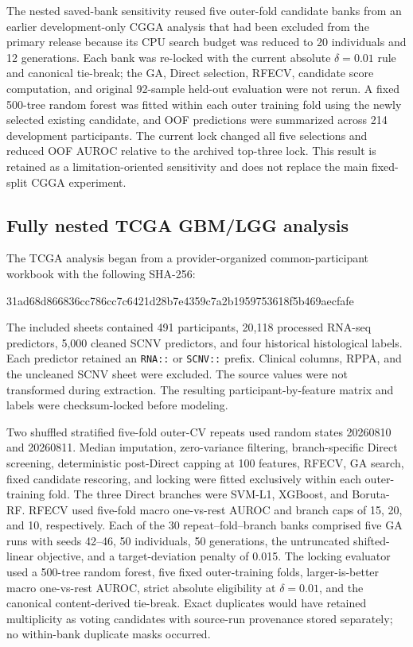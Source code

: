 The nested saved-bank sensitivity reused five outer-fold candidate banks from an earlier development-only CGGA analysis that had been excluded from the primary release because its CPU search budget was reduced to 20 individuals and 12 generations. Each bank was re-locked with the current absolute \(\delta=0.01\) rule and canonical tie-break; the GA, Direct selection, RFECV, candidate score computation, and original 92-sample held-out evaluation were not rerun. A fixed 500-tree random forest was fitted within each outer training fold using the newly selected existing candidate, and OOF predictions were summarized across 214 development participants. The current lock changed all five selections and reduced OOF AUROC relative to the archived top-three lock. This result is retained as a limitation-oriented sensitivity and does not replace the main fixed-split CGGA experiment.

\subsection{Fully nested TCGA GBM/LGG analysis}

The TCGA analysis began from a provider-organized common-participant workbook with the following SHA-256:
\begin{center}\scriptsize\ttfamily 31ad68d866836cc786cc7c6421d28b7e4359c7a2b1959753618f5b469aecfafe\end{center}
The included sheets contained 491 participants, 20,118 processed RNA-seq predictors, 5,000 cleaned SCNV predictors, and four historical histological labels. Each predictor retained an \texttt{RNA::} or \texttt{SCNV::} prefix. Clinical columns, RPPA, and the uncleaned SCNV sheet were excluded. The source values were not transformed during extraction. The resulting participant-by-feature matrix and labels were checksum-locked before modeling.

Two shuffled stratified five-fold outer-CV repeats used random states 20260810 and 20260811. Median imputation, zero-variance filtering, branch-specific Direct screening, deterministic post-Direct capping at 100 features, RFECV, GA search, fixed candidate rescoring, and locking were fitted exclusively within each outer-training fold. The three Direct branches were SVM-L1, XGBoost, and Boruta-RF. RFECV used five-fold macro one-vs-rest AUROC and branch caps of 15, 20, and 10, respectively. Each of the 30 repeat--fold--branch banks comprised five GA runs with seeds 42--46, 50 individuals, 50 generations, the untruncated shifted-linear objective, and a target-deviation penalty of 0.015. The locking evaluator used a 500-tree random forest, five fixed outer-training folds, larger-is-better macro one-vs-rest AUROC, strict absolute eligibility at \(\delta=0.01\), and the canonical content-derived tie-break. Exact duplicates would have retained multiplicity as voting candidates with source-run provenance stored separately; no within-bank duplicate masks occurred.

